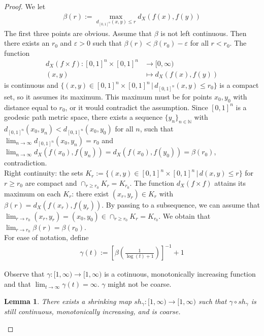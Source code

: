 \documentclass[a4paper,11pt]{article}
\theoremstyle{definition}
\theoremstyle{plain}
\newtheorem{lemma}[definition]{Lemma}
\theoremstyle{remark}
\begin{document}
{\begin{proof}
We let
\begin{align*}
\beta(r) := \max_{d_{[0,1]^n}(x,y)\leq r} d_{X}(f(x),f(y))
\end{align*}
The first three points are obvious. Assume that $\beta$ is not left continuous. Then there exists an $r_0$ and $\varepsilon>0$ such that $\beta(r) < \beta(r_0) -\varepsilon$ for all $r<r_0$. The function
\begin{align*}
d_{X}(f\times f):[0,1]^n \times [0,1]^n &\rightarrow [0,\infty)\\
(x,y) &\mapsto d_{X}(f(x),f(y))
\end{align*}
is continuous and $\{(x,y)\in [0,1]^n \times [0,1]^n\,|\,d_{[0,1]^n}(x,y)\leq r_0\}$ is a compact set, so it assumes its maximum. This maximum must be for points $x_{0},y_{0}$ with distance equal to $r_0$, or it would contradict the assumption. Since $[0,1]^n$ is a geodesic path metric space, there exists a sequence $\{y_n\}_{n\in \mathbb{N}}$ with $d_{[0,1]^n}(x_0,y_n)<d_{[0,1]^n}(x_0,y_0)$ for all $n$, such that $\lim_{n\rightarrow \infty} d_{[0,1]^n}(x_0,y_n)= r_0$ and $\lim_{n\rightarrow \infty} d_{X}(f(x_0),f(y_n)) =  d_{X}(f(x_0), f(y_0))=\beta(r_0)$, contradiction. \\

Right continuity: the sets $K_{r}:= \{(x,y)\in [0,1]^n \times [0,1]^n \,|\, d(x,y)\leq r\}$ for $r\geq r_0$ are compact and $\cap_{r\geq r_0} K_{r} = K_{r_0}$. The function $d_{X}(f\times f)$ attains its maximum on each $K_{r}$: there exist $(x_r,y_r) \in K_{r}$ with $\beta(r) = d_{X}(f(x_r),f(y_r))$. By passing to a subsequence, we can assume that $\lim_{r\rightarrow r_{0}} (x_{r},y_{r}) = (x_0,y_0) \in \cap_{r\geq r_0} K_{r}= K_{r_0}$. We obtain that $\lim_{r\rightarrow r_{0}} \beta(r) = \beta(r_0)$. \\ 

For ease of notation, define
\begin{align*}
\gamma(t):= [\beta(\frac{1}{\log(t)+1})]^{-1} +1
\end{align*}

Observe that $\gamma: [1,\infty)\rightarrow [1,\infty)$ is a cotinuous, monotonically increasing function and that $\lim_{t\rightarrow \infty} \gamma(t) = \infty$. $\gamma$ might not be coarse. 

\begin{lemma} There exists a shrinking map $sh_{\gamma}: [1,\infty)\rightarrow [1,\infty)$ such that $\gamma\circ sh_{\gamma}$ is still continuous, monotonically increasing, and is coarse. 
\end{lemma}


\end{proof}}
\end{document}
